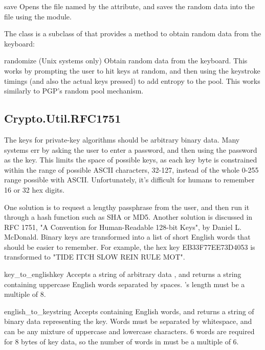 \documentclass{howto}
\begin{document}
\begin{methoddesc}{save}{}
Opens the file named by the  attribute, and saves the
random data into the file using the  module.
\end{methoddesc}

The  class is a subclass of
 that provides a method to obtain random
data from the keyboard:

\begin{methoddesc}{randomize}{}
(Unix systems only)  Obtain random data from the keyboard.  This works
by prompting the
user to hit keys at random, and then using the keystroke timings (and
also the actual keys pressed) to add entropy to the pool.  This works
similarly to PGP's random pool mechanism.
\end{methoddesc}


\subsection{Crypto.Util.RFC1751}
The keys for private-key algorithms should be arbitrary binary data.
Many systems err by asking the user to enter a password, and then
using the password as the key.  This limits the space of possible
keys, as each key byte is constrained within the range of possible
ASCII characters, 32-127, instead of the whole 0-255 range possible
with ASCII.  Unfortunately, it's difficult for humans to remember 16
or 32 hex digits.

One solution is to request a lengthy passphrase from the user, and
then run it through a hash function such as SHA or MD5.  Another
solution is discussed in RFC 1751, "A Convention for Human-Readable
128-bit Keys", by Daniel L. McDonald.  Binary keys are transformed
into a list of short English words that should be easier to remember.
For example, the hex key EB33F77EE73D4053 is transformed to "TIDE ITCH
SLOW REIN RULE MOT".

\begin{funcdesc}{key_to_english}{key}
Accepts a string of arbitrary data , and returns a string
containing uppercase English words separated by spaces.  's
length must be a multiple of 8.
\end{funcdesc}

\begin{funcdesc}{english_to_key}{string}
Accepts  containing English words, and returns a string of
binary data representing the key.  Words must be separated by
whitespace, and can be any mixture of uppercase and lowercase
characters.  6 words are required for 8 bytes of key data, so
the number of words in  must be a multiple of 6.
\end{funcdesc}
\end{document}
